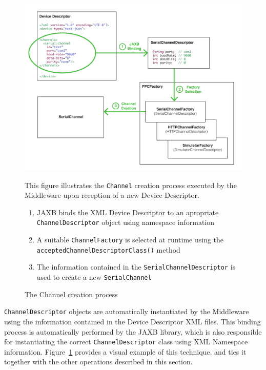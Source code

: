 \begin{figure}[!hbt]
\includegraphics[width=\textwidth]{imgs/channel_creation_process.pdf}
\caption{The Channel creation process}
\label{fig:channel.creation}
{
\begin{figurenote}
This figure illustrates the \texttt{Channel} creation process executed by the Middleware upon reception of a new Device Descriptor.
\begin{enumerate}
  \itemsep0em
  \item JAXB binds the XML Device Descriptor to an apropriate \texttt{ChannelDescriptor} object using namespace information
  \item A suitable \texttt{ChannelFactory} is selected at runtime using the \texttt{acceptedChannelDescriptorClass()} method
  \item The information contained in the \texttt{SerialChannelDescriptor} is used to create a new \texttt{SerialChannel}
\end{enumerate}
\vspace{-1em}
\end{figurenote}
}
\end{figure}

\texttt{ChannelDescriptor} objects are automatically instantiated by the Middleware using the information contained in the Device Descriptor XML files. This binding process is automatically performed by the JAXB library, which is also responsible for instantiating the correct \texttt{ChannelDescriptor} class using XML Namespace information. Figure~\ref{fig:channel.creation} provides a visual example of this technique, and ties it together with the other operations described in this section.


